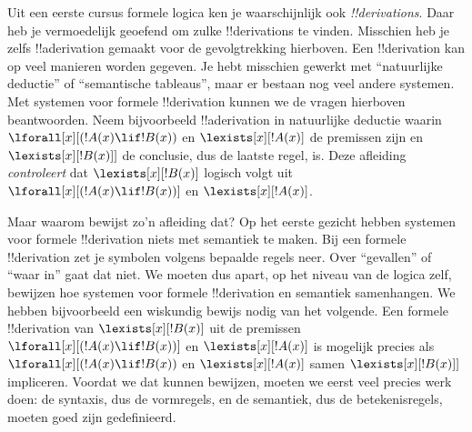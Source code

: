 \documentclass[openany]{memoir}
\begin{document}
Uit een eerste cursus formele logica ken je waarschijnlijk ook
\emph{!!{derivation}s}. Daar heb je vermoedelijk geoefend om zulke
!!{derivation}s te vinden. Misschien heb je zelfs !!a{derivation} gemaakt
voor de gevolgtrekking hierboven. Een !!{derivation} kan op veel manieren
worden gegeven. Je hebt misschien gewerkt met ``natuurlijke deductie''
of ``semantische tableaus'', maar er bestaan nog veel andere systemen.
Met systemen voor formele !!{derivation} kunnen we de vragen hierboven beantwoorden.
Neem bijvoorbeeld !!a{derivation} in natuurlijke deductie waarin
$\lforall[x][(!A(x) \lif !B(x))$ en $\lexists[x][!A(x)]$ de premissen
zijn en $\lexists[x][!B(x)]]$ de conclusie, dus de laatste regel, is.
Deze afleiding \emph{controleert} dat $\lexists[x][!B(x)]$ logisch volgt
uit $\lforall[x][(!A(x) \lif !B(x))]$ en $\lexists[x][!A(x)]$.

Maar waarom bewijst zo'n afleiding dat? Op het eerste gezicht hebben
systemen voor formele !!{derivation} niets met semantiek te maken. Bij een formele
!!{derivation} zet je symbolen volgens bepaalde regels neer. Over
``gevallen'' of ``waar in'' gaat dat niet. We moeten dus apart, op het
niveau van de logica zelf, bewijzen hoe systemen voor formele !!{derivation} en
semantiek samenhangen. We hebben bijvoorbeeld een wiskundig bewijs nodig
van het volgende. Een formele !!{derivation} van $\lexists[x][!B(x)]$
uit de premissen $\lforall[x][(!A(x) \lif !B(x))]$ en
$\lexists[x][!A(x)]$ is mogelijk precies als
$\lforall[x][(!A(x) \lif !B(x))$ en $\lexists[x][!A(x)]$ samen
$\lexists[x][!B(x)]]$ impliceren. Voordat we dat kunnen bewijzen, moeten
we eerst veel precies werk doen: de syntaxis, dus de vormregels, en de
semantiek, dus de betekenisregels, moeten goed zijn gedefinieerd.
\endgroup

\begingroup
\def\olfilename{OLP-0141}
\def\olfilepath{content/first-order-logic/introduction/}
\hypertarget{unit-OLP-0141}{}




\end{document}
